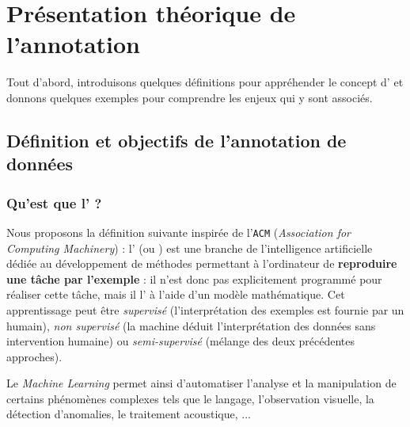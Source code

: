 \section{Présentation théorique de l'annotation}
\label{section:2.1-PRESENTATION-ANNOTATION}

	Tout d'abord, introduisons quelques définitions pour appréhender le concept d' et donnons quelques exemples pour comprendre les enjeux qui y sont associés.
	
	
	\subsection{Définition et objectifs de l'annotation de données}
	\label{section:2.1.1-PRESENTATION-ANNOTATION-DEFINITION}
	
		\subsubsection{Qu'est que l' ?}
		\label{section:2.1.1.A-PRESENTATION-ANNOTATION-DEFINITION-MACHINE-LEARNING}
			
			Nous proposons la définition suivante inspirée de l'\texttt{ACM} (\textit{Association for Computing Machinery}) : l' (ou ) est une branche de l'intelligence artificielle dédiée au développement de méthodes permettant à l'ordinateur de \textbf{reproduire une tâche par l'exemple} : il n'est donc pas explicitement programmé pour réaliser cette tâche, mais il l' à l'aide d'un modèle mathématique.
			Cet apprentissage peut être \textit{supervisé} (l'interprétation des exemples est fournie par un humain), \textit{non supervisé} (la machine déduit l'interprétation des données sans intervention humaine) ou \textit{semi-supervisé} (mélange des deux précédentes approches).
			
			Le \textit{Machine Learning} permet ainsi d'automatiser l'analyse et la manipulation de certains phénomènes complexes tels que le langage, l'observation visuelle, la détection d'anomalies, le traitement acoustique, ...
			
